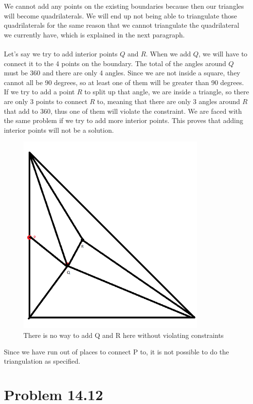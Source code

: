 \documentclass[11pt,psfig]{article}
\begin{document}
We cannot add any points on the existing boundaries because then our triangles will become quadrilaterals. We will end up not being able to triangulate those quadrilaterals for the same reason that we cannot triangulate the quadrilateral we currently have, which is explained in the next paragraph.\\
\\
Let's say we try to add interior points $Q$ and $R$. When we add $Q$, we will have to connect it to the 4 points on the boundary. The total of the angles around $Q$ must be 360 and there are only 4 angles. Since we are not inside a square, they cannot all be 90 degrees, so at least one of them will be greater than 90 degrees. If we try to add a point $R$ to split up that angle, we are inside a triangle, so there are only 3 points to connect $R$ to, meaning that there are only 3 angles around $R$ that add to 360, thus one of them will violate the constraint. We are faced with the same problem if we try to add more interior points. This proves that adding interior points will not be a solution. 
\begin{figure}[H]
\centering
\includegraphics[height=4in]{hw5prob3_diagram5.png}
\caption{There is no way to add Q and R here without violating constraints}
\end{figure}  
Since we have run out of places to connect P to, it is not possible to do the triangulation as specified.
\newpage

\section*{Problem 14.12}
\end{document}
